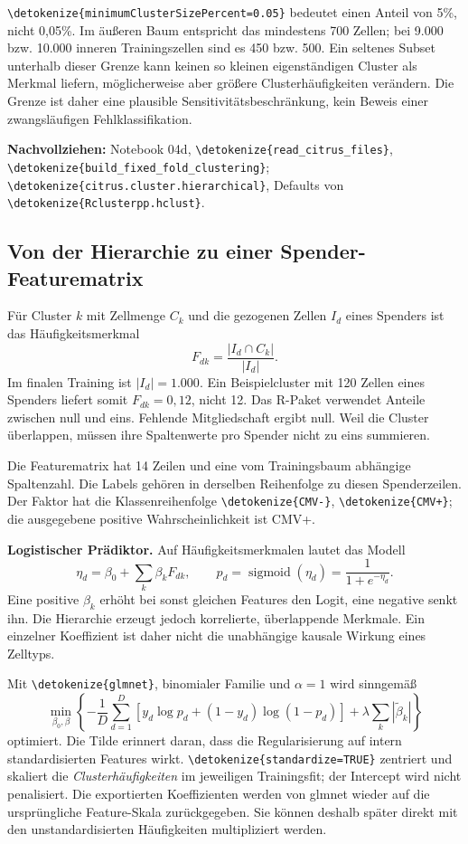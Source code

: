 \documentclass[11pt,a4paper]{article}
\newcommand{\code}[1]{\expandafter\nolinkurl\expandafter{\detokenize{#1}}}
\newcommand{\source}[1]{\par{\footnotesize\raggedright\color{muted}\textbf{Nachvollziehen:} #1\par}}
\begin{document}
\code{minimumClusterSizePercent=0.05} bedeutet einen Anteil von 5\%,
nicht 0,05\%. Im äußeren Baum entspricht das mindestens 700 Zellen;
bei 9.000 bzw. 10.000 inneren Trainingszellen sind es 450 bzw. 500.
Ein seltenes Subset unterhalb dieser Grenze kann keinen so kleinen
eigenständigen Cluster als Merkmal liefern, möglicherweise aber größere
Clusterhäufigkeiten verändern. Die Grenze ist daher eine plausible
Sensitivitätsbeschränkung, kein Beweis einer zwangsläufigen Fehlklassifikation.
\source{Notebook 04d, \code{read_citrus_files}, \code{build_fixed_fold_clustering};
\code{citrus.cluster.hierarchical}, Defaults von \code{Rclusterpp.hclust}.}

\clearpage
\subsection*{Von der Hierarchie zu einer Spender-Featurematrix}
Für Cluster \(k\) mit Zellmenge \(C_k\) und die gezogenen Zellen
\(I_d\) eines Spenders ist das Häufigkeitsmerkmal
\[
 F_{dk}=\frac{|I_d\cap C_k|}{|I_d|}.
\]
Im finalen Training ist \(|I_d|=1.000\). Ein Beispielcluster mit
120 Zellen eines Spenders liefert somit \(F_{dk}=0{,}12\), nicht 12.
Das R-Paket verwendet Anteile zwischen null und eins. Fehlende
Mitgliedschaft ergibt null. Weil die Cluster überlappen, müssen ihre
Spaltenwerte pro Spender nicht zu eins summieren.

Die Featurematrix hat 14 Zeilen und eine vom Trainingsbaum abhängige
Spaltenzahl. Die Labels gehören in derselben Reihenfolge zu diesen
Spenderzeilen. Der Faktor hat die Klassenreihenfolge \code{CMV-},
\code{CMV+}; die ausgegebene positive Wahrscheinlichkeit ist CMV+.

\textbf{Logistischer Prädiktor.} Auf Häufigkeitsmerkmalen lautet das Modell
\[
 \eta_d=\beta_0+\sum_k\beta_kF_{dk},\qquad
 p_d=\operatorname{sigmoid}(\eta_d)=\frac1{1+e^{-\eta_d}}.
\]
Eine positive \(\beta_k\) erhöht bei sonst gleichen Features den Logit,
eine negative senkt ihn. Die Hierarchie erzeugt jedoch korrelierte,
überlappende Merkmale. Ein einzelner Koeffizient ist daher nicht die
unabhängige kausale Wirkung eines Zelltyps.

Mit \code{glmnet}, binomialer Familie und \(\alpha=1\) wird sinngemäß
\[
 \min_{\beta_0,\beta}\left\{-\frac1D\sum_{d=1}^D
 [y_d\log p_d+(1-y_d)\log(1-p_d)]
 +\lambda\sum_k|\widetilde\beta_k|\right\}
\]
optimiert. Die Tilde erinnert daran, dass die Regularisierung auf intern
standardisierten Features wirkt. \code{standardize=TRUE} zentriert und
skaliert die \emph{Clusterhäufigkeiten} im jeweiligen Trainingsfit;
der Intercept wird nicht penalisiert. Die exportierten Koeffizienten
werden von glmnet wieder auf die ursprüngliche Feature-Skala zurückgegeben.
Sie können deshalb später direkt mit den unstandardisierten Häufigkeiten
multipliziert werden\cite{glmnet}.
\end{document}
